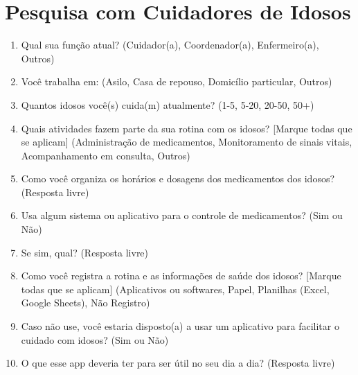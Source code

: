 \section{Pesquisa com Cuidadores de Idosos}
\begin{enumerate}
    \item Qual sua função atual? (Cuidador(a), Coordenador(a), Enfermeiro(a), Outros)
    \item Você trabalha em: (Asilo, Casa de repouso, Domicílio particular, Outros)
    \item Quantos idosos você(s) cuida(m) atualmente? (1-5, 5-20, 20-50, 50+)
    \item Quais atividades fazem parte da sua rotina com os idosos? [Marque todas que se aplicam] (Administração de medicamentos, Monitoramento de sinais vitais, Acompanhamento em consulta, Outros)
    \item Como você organiza os horários e dosagens dos medicamentos dos idosos? (Resposta livre)
    \item Usa algum sistema ou aplicativo para o controle de medicamentos? (Sim ou Não)
    \item Se sim, qual? (Resposta livre)
    \item Como você registra a rotina e as informações de saúde dos idosos? [Marque todas que se aplicam] (Aplicativos ou softwares, Papel, Planilhas (Excel, Google Sheets), Não Registro)
    \item Caso não use, você estaria disposto(a) a usar um aplicativo para facilitar o cuidado com idosos? (Sim ou Não)
    \item O que esse app deveria ter para ser útil no seu dia a dia? (Resposta livre)
\end{enumerate}
